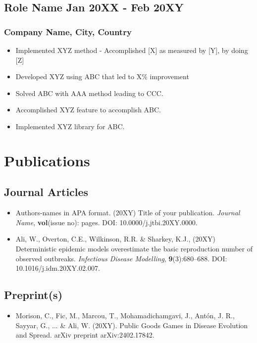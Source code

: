 \documentclass[11pt]{article}
\begin{document}
    \subsection{Role Name \hfill \normalfont Jan 20XX - Feb 20XY}
    \subsubsection{Company Name, City, Country}
    \begin{itemize}
        \item[\checkmark] Implemented XYZ method - Accomplished [X] as measured by [Y], by doing [Z] 
        \item[\checkmark]  Developed XYZ using ABC that led to X\% improvement 
        \item[\checkmark] Solved ABC with AAA method leading to CCC.
        \item[\checkmark]  Accomplished XYZ feature to accomplish ABC.
        \item[\checkmark]  Implemented XYZ library for ABC.
    \end{itemize}
    \section{Publications}
    \subsection{Journal Articles}
    \begin{itemize}
        \item[\checkmark] Authors-names in APA format. (20XY) Title of your publication. \textit{Journal Name}, \textbf{vol}(issue no): pages. DOI: 10.0000/j.jtbi.20XY.0000. %
        \item[\checkmark] Ali, W., Overton, C.E., Wilkinson, R.R. \& Sharkey, K.J., (20XY) Deterministic epidemic models overestimate the basic reproduction number of observed outbreaks. \textit{Infectious Disease Modelling}, \textbf{9}(3):680–688. DOI: 10.1016/j.idm.20XY.02.007.
    \end{itemize}
    \subsection{Preprint(s)}
    \begin{itemize}
        \item[\checkmark] Morison, C., Fic, M., Marcou, T., Mohamadichamgavi, J., Antón, J. R., Sayyar, G., ... \& Ali, W. (20XY). Public Goods Games in Disease Evolution and Spread. arXiv preprint arXiv:2402.17842.
    \end{itemize}
\end{document}
